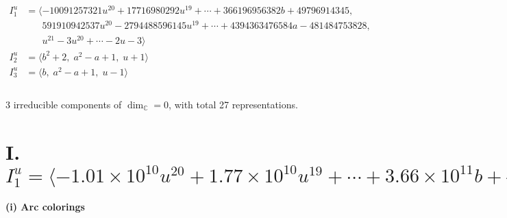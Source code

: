 \documentclass[1p]{elsarticle_modified}
\theoremstyle{definition}
\begin{document}
\begin{align*}
I^u_{1}&=\langle 
-10091257321 u^{20}+17716980292 u^{19}+\cdots+366196956382 b+49796914345,\\
\phantom{I^u_{1}}&\phantom{= \langle  }591910942537 u^{20}-2794488596145 u^{19}+\cdots+4394363476584 a-481484753828,\\
\phantom{I^u_{1}}&\phantom{= \langle  }u^{21}-3 u^{20}+\cdots-2 u-3\rangle \\
I^u_{2}&=\langle 
b^2+2,\;a^2- a+1,\;u+1\rangle \\
I^u_{3}&=\langle 
b,\;a^2- a+1,\;u-1\rangle \\
\\
\end{align*}
\raggedright * 3 irreducible components of $\dim_{\mathbb{C}}=0$, with total 27 representations.\\
\newpage
\renewcommand{\arraystretch}{1}
\centering \section*{I. $I^u_{1}= \langle -1.01\times10^{10} u^{20}+1.77\times10^{10} u^{19}+\cdots+3.66\times10^{11} b+4.98\times10^{10},\;5.92\times10^{11} u^{20}-2.79\times10^{12} u^{19}+\cdots+4.39\times10^{12} a-4.81\times10^{11},\;u^{21}-3 u^{20}+\cdots-2 u-3 \rangle$}
\flushleft \textbf{(i) Arc colorings}\\
\end{document}
